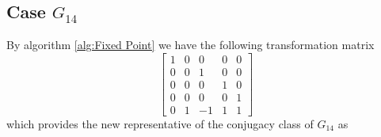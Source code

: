 \documentclass{article}
\theoremstyle{plain}
\theoremstyle{definition}
\newcommand{\tand}{\ensuremath{\,\,\, \text{and} \,\,\,}}
\begin{document}
\subsection{Case $G_{14}$}
By algorithm \ref{alg:Fixed Point} we have the following transformation matrix 
$$
 \left[ \begin {array}{ccccc} 1&0&0&0&0\\ 0&0&1&0&0
\\ 0&0&0&1&0\\ 0&0&0&0&1
\\ 0&1&-1&1&1\end {array} \right] 
$$
which provides the new representative of the conjugacy class of $G_{14}$ as
\end{document}
